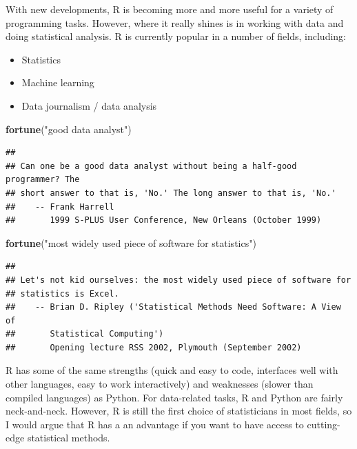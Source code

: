 \documentclass[]{book}
\makeatletter
\newenvironment{Shaded}{\begin{snugshade}}{\end{snugshade}}
\newcommand{\KeywordTok}[1]{\textcolor[rgb]{0.13,0.29,0.53}{\textbf{#1}}}
\newcommand{\StringTok}[1]{\textcolor[rgb]{0.31,0.60,0.02}{#1}}
\newcommand{\NormalTok}[1]{#1}
\providecommand{\tightlist}{%
  \setlength{\itemsep}{0pt}\setlength{\parskip}{0pt}}
\newenvironment{kframe}{%
\medskip{}
\setlength{\fboxsep}{.8em}
 \def\at@end@of@kframe{}%
 \ifinner\ifhmode%
  \def\at@end@of@kframe{\end{minipage}}%
  \begin{minipage}{\columnwidth}%
 \fi\fi%
 \def\FrameCommand##1{\hskip\@totalleftmargin \hskip-\fboxsep
 \colorbox{shadecolor}{##1}\hskip-\fboxsep
     \hskip-\linewidth \hskip-\@totalleftmargin \hskip\columnwidth}%
 \MakeFramed {\advance\hsize-\width
   \@totalleftmargin\z@ \linewidth\hsize
   \@setminipage}}%
 {\par\unskip\endMakeFramed%
 \at@end@of@kframe}
\renewenvironment{Shaded}{\begin{kframe}}{\end{kframe}}
\theoremstyle{definition}
\theoremstyle{definition}
\theoremstyle{definition}
\theoremstyle{remark}
\makeatother
\begin{document}
With new developments, R is becoming more and more useful for a variety
of programming tasks. However, where it really shines is in working with
data and doing statistical analysis. R is currently popular in a number
of fields, including:

\begin{itemize}
\tightlist
\item
  Statistics
\item
  Machine learning
\item
  Data journalism / data analysis
\end{itemize}

\begin{Shaded}
\begin{Highlighting}[]
\KeywordTok{fortune}\NormalTok{(}\StringTok{"good data analyst"}\NormalTok{)}
\end{Highlighting}
\end{Shaded}

\begin{verbatim}
## 
## Can one be a good data analyst without being a half-good programmer? The
## short answer to that is, 'No.' The long answer to that is, 'No.'
##    -- Frank Harrell
##       1999 S-PLUS User Conference, New Orleans (October 1999)
\end{verbatim}

\begin{Shaded}
\begin{Highlighting}[]
\KeywordTok{fortune}\NormalTok{(}\StringTok{"most widely used piece of software for statistics"}\NormalTok{)}
\end{Highlighting}
\end{Shaded}

\begin{verbatim}
## 
## Let's not kid ourselves: the most widely used piece of software for
## statistics is Excel.
##    -- Brian D. Ripley ('Statistical Methods Need Software: A View of
##       Statistical Computing')
##       Opening lecture RSS 2002, Plymouth (September 2002)
\end{verbatim}

R has some of the same strengths (quick and easy to code, interfaces
well with other languages, easy to work interactively) and weaknesses
(slower than compiled languages) as Python. For data-related tasks, R
and Python are fairly neck-and-neck. However, R is still the first
choice of statisticians in most fields, so I would argue that R has a an
advantage if you want to have access to cutting-edge statistical
methods.
\end{document}
